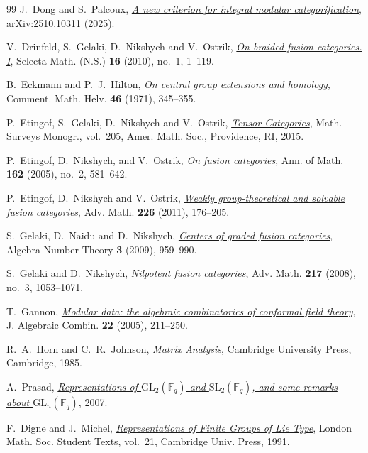 \documentclass[11pt]{amsart}
\numberwithin{equation}{section}
\theoremstyle{definition}
\theoremstyle{plain}
\begin{document}
\begin{thebibliography}{99}
J.~Dong and S.~Palcoux,
\href{https://arxiv.org/abs/2510.10311}{\emph{A new criterion for integral
modular categorification}}, arXiv:2510.10311 (2025).

V.~Drinfeld, S.~Gelaki, D.~Nikshych and V.~Ostrik,
\href{https://doi.org/10.1007/s00029-010-0017-z}{\emph{On braided fusion categories. I}},
Selecta Math. (N.S.) \textbf{16} (2010), no.~1, 1--119.

B.~Eckmann and P.~J.~Hilton,
\href{https://doi.org/10.1007/BF02566849}{\emph{On central group
extensions and homology}}, Comment. Math. Helv. \textbf{46}
(1971), 345--355.

P.~Etingof, S.~Gelaki, D.~Nikshych and V.~Ostrik,
\href{https://doi.org/10.1090/surv/205}{\emph{Tensor Categories}},
Math. Surveys Monogr., vol.~205, Amer. Math. Soc., Providence, RI, 2015.

P.~Etingof, D.~Nikshych, and V.~Ostrik,
\href{https://doi.org/10.4007/annals.2005.162.581}{\emph{On fusion categories}},
Ann. of Math. \textbf{162} (2005), no.~2, 581--642.

P.~Etingof, D.~Nikshych and V.~Ostrik,
\href{https://doi.org/10.1016/j.aim.2010.06.009}{\emph{Weakly
group-theoretical and solvable fusion categories}}, Adv. Math.
\textbf{226} (2011), 176--205.

S.~Gelaki, D.~Naidu and D.~Nikshych,
\href{https://doi.org/10.2140/ant.2009.3.959}{\emph{Centers of graded
fusion categories}}, Algebra Number Theory \textbf{3} (2009), 959--990.

S.~Gelaki and D.~Nikshych,
\href{https://arxiv.org/abs/math/0610726}{\emph{Nilpotent fusion categories}},
Adv. Math. \textbf{217} (2008), no.~3, 1053--1071.

T.~Gannon, \href{https://arxiv.org/abs/math/0103044}{\emph{Modular data:
the algebraic combinatorics of conformal field theory}},
J. Algebraic Combin. \textbf{22} (2005), 211--250.

R.~A.~Horn and C.~R.~Johnson, \emph{Matrix Analysis},
Cambridge University Press, Cambridge, 1985.

A.~Prasad, \href{https://arxiv.org/abs/0712.4051}{\emph{Representations
of $\mathrm{GL}_2(\mathbb F_q)$ and $\mathrm{SL}_2(\mathbb F_q)$, and
some remarks about $\mathrm{GL}_n(\mathbb F_q)$}}, 2007.

F.~Digne and J.~Michel,
\href{https://www.cambridge.org/core/books/representations-of-finite-groups-of-lie-type/3E2A81B39F7BBC7B3B0ECBD0AC0B8E60}{\emph{Representations of Finite Groups of Lie Type}},
London Math. Soc. Student Texts, vol.~21, Cambridge Univ. Press, 1991.


\end{thebibliography}
\end{document}

